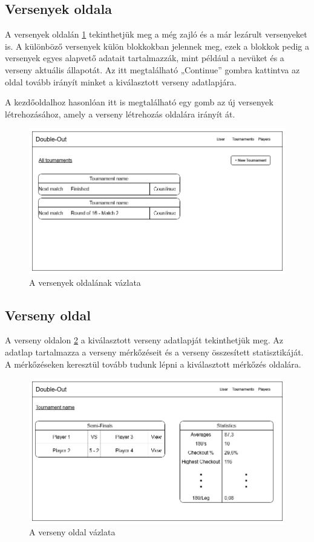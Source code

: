 \subsection{Versenyek oldala}
A versenyek oldalán \ref{fig:tournaments} tekinthetjük meg a még zajló és a már lezárult versenyeket is. A különböző versenyek külön blokkokban jelennek meg, ezek a blokkok pedig a versenyek egyes alapvető adatait tartalmazzák, mint például a nevüket és a verseny aktuális állapotát. Az itt megtalálható „Continue” gombra kattintva az oldal tovább irányít minket a kiválasztott verseny adatlapjára.

A kezdőoldalhoz hasonlóan itt is megtalálható egy gomb az új versenyek létrehozásához, amely a verseny létrehozás oldalára irányít át. 

\begin{figure}[h]
\centering
\includegraphics[scale=0.4]{images/Tournaments.png}
\caption{A versenyek oldalának vázlata}
\label{fig:tournaments}
\end{figure}

\subsection{Verseny oldal}
A verseny oldalon \ref{fig:tournament} a kiválasztott verseny adatlapját tekinthetjük meg. Az adatlap tartalmazza a verseny mérkőzéseit és a verseny összesített statisztikáját. A mérkőzéseken keresztül tovább tudunk lépni a kiválasztott mérkőzés oldalára.

\begin{figure}[h]
\centering
\includegraphics[scale=0.4]{images/TournamentPage.png}
\caption{A verseny oldal vázlata}
\label{fig:tournament}
\end{figure}

